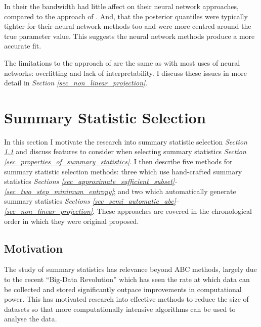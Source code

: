 \documentclass[11pt,a4paper]{article}
\theoremstyle{break}
\begin{document}
  \par In their the bandwidth had little affect on their neural network approaches, compared to the approach of \cite[]{ABC_in_population_genetics}. And, that the posterior quantiles were typically tighter for their neural network methods too and were more centred around the true parameter value. This suggests the neural network methods produce a more accurate fit.

  \par The limitations to the approach of \cite[]{non_linear_regression_models_for_abc} are the same as with most uses of neural networks: overfitting and lack of interpretability. I discuss these issues in more detail in \textit{Section \ref{sec_non_linear_projection}}.

\newpage
\section{Summary Statistic Selection}\label{sec_summary_stats}


  In this section I motivate the research into summary statistic selection \textit{Section \ref{sec_summary_stats_motivation}} and discuss features to consider when selecting summary statistics \textit{Section \ref{sec_properties_of_summary_statistics}}. I then describe five methods for summary statistic selection methods: three which use hand-crafted summary statistics \textit{Sections \ref{sec_approximate_sufficient_subset}-\ref{sec_two_step_minimum_entropy}}; and two which automatically generate summary statistics \textit{Sections \ref{sec_semi_automatic_abc}-\ref{sec_non_linear_projection}}. These approaches are covered in the chronological order in which they were original proposed.


\subsection{Motivation}\label{sec_summary_stats_motivation}



  \par The study of summary statistics has relevance beyond ABC methods, largely due to the recent ``Big-Data Revolution'' which has seen the rate at which data can be collected and stored significantly outpace improvements in computational power. This has motivated research into effective methods to reduce the size of datasets so that more computationally intensive algorithms can be used to analyse the data. %
\end{document}

